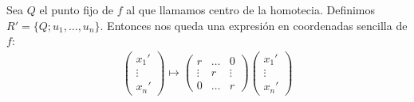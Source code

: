 \documentclass[14pt]{book}
\begin{document}
Sea $Q$ el punto fijo de $f$ al que llamamos centro de la homotecia. Definimos $R' = \{Q; u_1, \dots, u_n\}$. Entonces nos queda una expresión en coordenadas sencilla de $f$:
\begin{align*}
\left(\begin{array}{c}
x_1' \\ \vdots \\ x_n'
\end{array}\right) \mapsto
\left(\begin{array}{ccc}
r & \dots & 0 \\ \vdots & r & \vdots \\ 0 & \dots & r
\end{array}\right)
\left(\begin{array}{c}
x_1' \\ \vdots \\ x_n'
\end{array}\right)
\end{align*}

\end{document}
